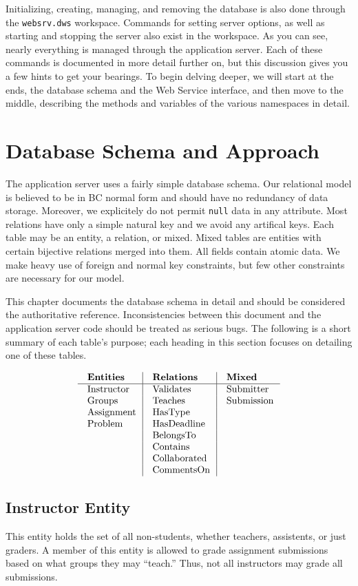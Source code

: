 Initializing, creating, managing, and removing the database is also done through
the {\tt websrv.dws} workspace.  Commands for setting server options, as well as
starting and stopping the server also exist in the workspace.  As you can see, 
nearly everything is managed through the application server.  Each of these 
commands is documented in more detail further on, but this discussion gives you 
a few hints to get your bearings.
To begin delving deeper, we will start at the ends, the database schema and 
the Web Service interface, and then move to the middle, describing the methods 
and variables of the various namespaces in detail.

\section{Database Schema and Approach}

\noindent
The application server uses a fairly simple database schema.
Our relational model is believed to be in BC normal form and 
should have no redundancy of data storage.
Moreover, we explicitely do not permit {\tt null} data in any attribute.
Most relations have only a simple natural key and we avoid any 
artifical keys. Each table may be an entity, a relation, or mixed. 
Mixed tables are entities with certain bijective relations merged into them.
All fields contain atomic data.
We make heavy use of foreign and normal key constraints, 
but few other constraints are necessary for our model.

This chapter documents the database schema in detail and should be 
considered the authoritative reference. 
Inconsistencies between this document and the application server code should be 
treated as serious bugs. The following is a short summary of each table's 
purpose; each heading in this section focuses on detailing one of these tables.

$$\vbox{
	\offinterlineskip
	\halign{
		\strut \quad #	& \vrule\quad #	& \vrule\quad # \cr
		{\bf Entities}	& {\bf Relations}	& {\bf Mixed}\cr
		\noalign{\hrule}		
		Instructor	& Validates	& Submitter \cr
		Groups	& Teaches	& Submission \cr
		Assignment	& HasType	& \cr
		Problem	& HasDeadline	& \cr
			& BelongsTo	& \cr
			& Contains	& \cr
			& Collaborated	& \cr
			& CommentsOn	& \cr
	}
}$$

\subsection{Instructor Entity}
This entity holds the set of all non-students, 
whether teachers, assistents, or just graders.
A member of this entity is allowed to grade assignment submissions
based on what groups they may ``teach.''
Thus, not all instructors may grade all submissions.

